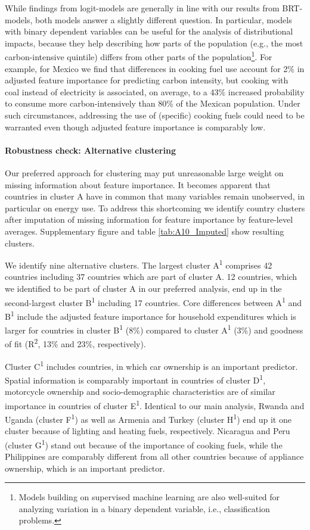 \documentclass[12pt, a4paper]{article}
\begin{document}
While findings from logit-models are generally in line with our results from BRT-models, both models answer a slightly different question. In particular, models with binary dependent variables can be useful for the analysis of distributional impacts, because they help describing how parts of the population (e.g., the most carbon-intensive quintile) differs from other parts of the population\footnote{Models building on supervised machine learning are also well-suited for analyzing variation in a binary dependent variable, i.e., classification problems.}. For example, for Mexico we find that differences in cooking fuel use account for 2\% in adjusted feature importance for predicting carbon intensity, but cooking with coal instead of electricity is associated, on average, to a 43\% increased probability to consume more carbon-intensively than 80\% of the Mexican population. Under such circumstances, addressing the use of (specific) cooking fuels could need to be warranted even though adjusted feature importance is comparably low.

\paragraph{Robustness check: Alternative clustering}

Our preferred approach for clustering may put unreasonable large weight on missing information about feature importance. It becomes apparent that countries in cluster A have in common that many variables remain unobserved, in particular on energy use. To address this shortcoming we identify country clusters after imputation of missing information for feature importance by feature-level averages. Supplementary figure  and table \ref{tab:A10_Imputed} show resulting clusters.

We identify nine alternative clusters. The largest cluster A\textsuperscript{1} comprises 42 countries including 37 countries which are part of cluster A. 12 countries, which we identified to be part of cluster A in our preferred analysis, end up in the second-largest cluster B\textsuperscript{1} including 17 countries. Core differences between A\textsuperscript{1} and B\textsuperscript{1} include the adjusted feature importance for household expenditures which is larger for countries in cluster B\textsuperscript{1} (8\%) compared to cluster A\textsuperscript{1} (3\%) and goodness of fit (R\textsuperscript{2}, 13\% and 23\%, respectively).

Cluster C\textsuperscript{1} includes countries, in which car ownership is an important predictor. Spatial information is comparably important in countries of cluster D\textsuperscript{1}, motorcycle ownership and socio-demographic characteristics are of similar importance in countries of cluster E\textsuperscript{1}. Identical to our main analysis, Rwanda and Uganda (cluster F\textsuperscript{1}) as well as Armenia and Turkey (cluster H\textsuperscript{1}) end up it one cluster because of lighting and heating fuels, respectively. Nicaragua and Peru (cluster G\textsuperscript{1}) stand out because of the importance of cooking fuels, while the Philippines are comparably different from all other countries because of appliance ownership, which is an important predictor.
\end{document}
